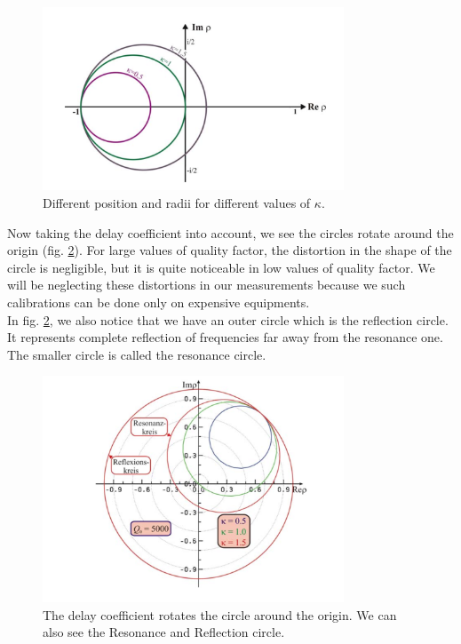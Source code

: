 \documentclass[a4paper]{report}
\numberwithin{equation}{section}
\begin{document}
\begin{figure}[hbt!]
    \centering
    \includegraphics[width=0.8\textwidth]{circles}
	\caption{Different position and radii for different values of $\kappa$. \cite{Hillert}}
    \label{fig:circles}
\end{figure}

Now taking the delay coefficient into account, we see the circles rotate around the origin (fig. \ref{fig:delay}). For large values of quality factor, the distortion in the shape of the circle is negligible, but it is quite noticeable in low values of quality factor. We will be neglecting these distortions in our measurements because we such calibrations can be done only on expensive equipments. \\
In fig. \ref{fig:delay}, we also notice that we have an outer circle which is the reflection circle. It represents complete reflection of frequencies far away from the resonance one. The smaller circle is called the resonance circle. 

\begin{figure}[hbt!]
    \centering
    \includegraphics[width=0.8\textwidth]{delay}
	\caption{The delay coefficient rotates the circle around the origin. We can also see the Resonance and Reflection circle. \cite{Hillert}}
    \label{fig:delay}
\end{figure}
\end{document}

